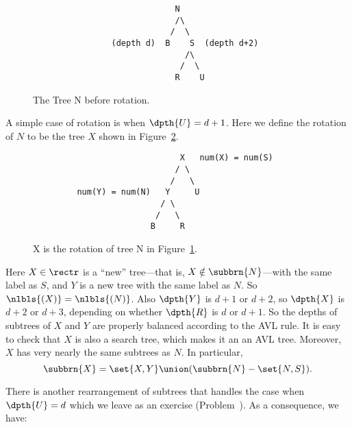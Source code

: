 \begin{definition}
\iffalse
where the integer labels indicate the relative sizes of the numerical
labels\fi

\begin{figure}
\begin{verbatim}
                             N
                             /\
                            /  \
                (depth d)  B    S  (depth d+2)
                               /\
                              /  \
                             R    U
\end{verbatim}

\caption{The Tree N before rotation.}

\label{rotate1}

\end{figure}

A simple case of rotation is when $\dpth{U} = d+1$.  Here we define
the rotation of $N$ to be the tree $X$ shown in Figure~\ref{rotate2}.

\begin{figure}

\begin{verbatim}
                              X   num(X) = num(S)
                             / \
                            /   \
         num(Y) = num(N)   Y     U
                          / \  
                         /   \
                        B     R   
\end{verbatim}

\caption{X is the rotation of tree N in Figure~\ref{rotate1}.}

\label{rotate2}
                                                                   
\end{figure}                                                       

Here $X \in \rectr$ is a ``new'' tree---that is, $X \notin
\subbrn{N}$---with the same label as $S$, and $Y$ is a new tree with
the same label as $N$.  So $\nlbls{(X)} = \nlbls{(N)}$.  Also
$\dpth{Y}$ is $d+1$ or $d+2$, so $\dpth{X}$ is $d+2$ or $d+3$,
depending on whether $\dpth{R}$ is $d$ or $d+1$.  So the depths of
subtrees of $X$ and $Y$ are properly balanced according to the AVL
rule.  It is easy to check that $X$ is also a search tree, which makes
it an an AVL tree.  Moreover, $X$ has very nearly the same subtrees as
$N$.  In particular,
\[
\subbrn{X} = \set{X,Y} \union (\subbrn{N} - \set{N,S}).
\]

There is another rearrangement of subtrees that handles the case when
$\dpth{U} = d$ which we leave as an exercise
(Problem~\bref{CP_AVL_rotate}).  As a consequence, we have:


\end{definition}
